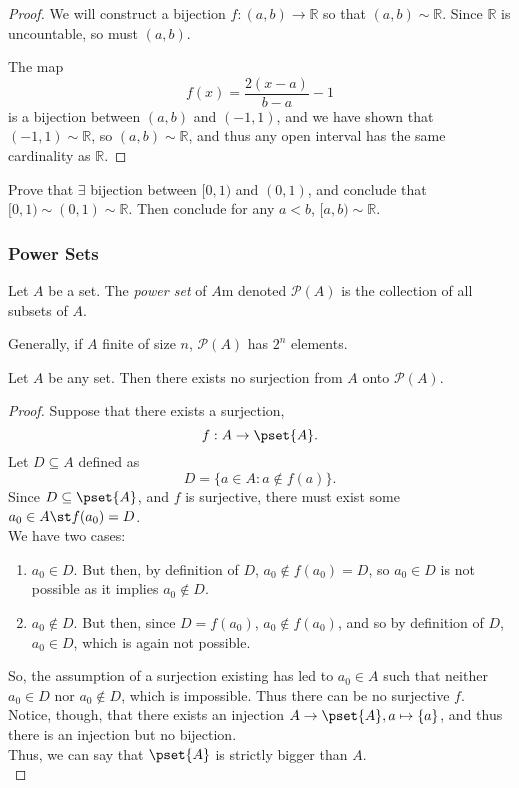 \documentclass[12pt]{article}
\begin{document}
\begin{proof}
  We will construct a bijection $f: (a,b) \to \mathbb{R}$ so that $(a,b) \sim \mathbb{R}$. Since $\mathbb{R}$ is  uncountable, so must $(a,b)$. 
  
  The map \[f(x)=\frac{2(x-a)}{b-a} - 1\] is a bijection between $(a,b)$ and $(-1,1)$, and we have shown that $(-1,1) \sim \mathbb{R}$, so $(a,b) \sim \mathbb{R}$, and thus any open interval has the same cardinality as $\mathbb{R}$.
\end{proof}

\begin{example}
  Prove that $\exists$ bijection between $[0,1)$ and $(0,1)$, and conclude that $[0,1) \sim (0,1) \sim \mathbb{R}$. Then conclude for any $a < b$, $[a,b) \sim \mathbb{R}$.

\end{example}

\subsubsection{Power Sets}
\begin{definition}
  Let $A$ be a set. The \emph{power set} of $A$m denoted $\mathcal{P}(A)$ is the collection of all subsets of $A$.

  Generally, if $A$ finite of size $n$, $\mathcal{P}(A)$ has $2^n$ elements.
\end{definition}

\begin{theorem}
  Let $A$ be any set. Then there exists no surjection from $A$ onto $\mathcal{P}(A)$. \footnotemark
\end{theorem}


\begin{proof}
  Suppose that there exists a surjection, \[f: A \to \pset{A}.\] Let $D \subseteq A$ defined as \[D = \{a \in A: a \notin f(a)\}.\] Since $D \subseteq \pset{A}$, and $f$ is surjective, there must exist some $a_0 \in A \st f(a_0) = D$.\\
  We have two cases:
  \begin{enumerate}
    \item $a_0 \in D.$ But then, by definition of $D$, $a_0 \notin f(a_0) = D$, so $a_0 \in D$ is not possible as it implies $a_0 \notin D$.
    \item $a_0 \notin D.$ But then, since $D = f(a_0)$, $a_0 \notin f(a_0)$, and so by definition of $D$, $a_0 \in D$, which is again not possible.
  \end{enumerate}
  So, the assumption of a surjection existing has led to $a_0 \in A$ such that neither $a_0 \in D$ nor $a_0 \notin D$, which is impossible. Thus there can be no surjective $f$.\\
  Notice, though, that there exists an injection $A \to \pset{A}, a \mapsto \{a\}$, and thus there is an injection but no bijection.\\
  Thus, we can say that $\pset{A}$ is strictly bigger than $A$.\\
\end{proof}
\end{document}

